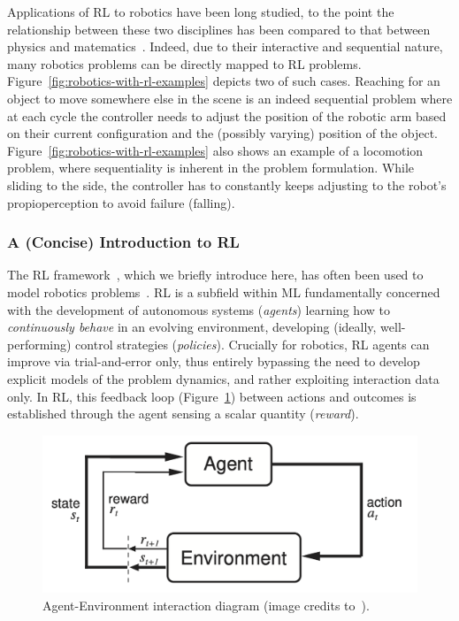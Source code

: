 Applications of RL to robotics have been long studied, to the point the relationship between these two disciplines has been compared to that between physics and matematics~\citep{koberReinforcementLearningRobotics}.
Indeed, due to their interactive and sequential nature, many robotics problems can be directly mapped to RL problems.
Figure~\ref{fig:robotics-with-rl-examples} depicts two of such cases. 
Reaching for an object to move somewhere else in the scene is an indeed sequential problem where at each cycle the controller needs to adjust the position of the robotic arm based on their current configuration and the (possibly varying) position of the object.
Figure~\ref{fig:robotics-with-rl-examples} also shows an example of a locomotion problem, where sequentiality is inherent in the problem formulation. 
While sliding to the side, the controller has to constantly keeps adjusting to the robot's propioperception to avoid failure (falling).

\subsubsection{A (Concise) Introduction to RL}
The RL framework~\citep{suttonReinforcementLearningIntroduction2018}, which we briefly introduce here, has often been used to model robotics problems~\citep{koberReinforcementLearningRobotics}.
RL is a subfield within ML fundamentally concerned with the development of autonomous systems (\emph{agents}) learning how to \emph{continuously behave} in an evolving environment, developing (ideally, well-performing) control strategies (\emph{policies}).
Crucially for robotics, RL agents can improve via trial-and-error only, thus entirely bypassing the need to develop explicit models of the problem dynamics, and rather exploiting interaction data only.
In RL, this feedback loop (Figure~\ref{fig:rl-most-famous-pic}) between actions and outcomes is established through the agent sensing a scalar quantity (\emph{reward}).

\begin{figure}
    \centering
    \includegraphics[width=0.5\linewidth]{figures/ch3/ch3-agent-env.png}
    \caption{Agent-Environment interaction diagram (image credits to~\citet{suttonReinforcementLearningIntroduction2018}).}
    \label{fig:rl-most-famous-pic}
\end{figure}

